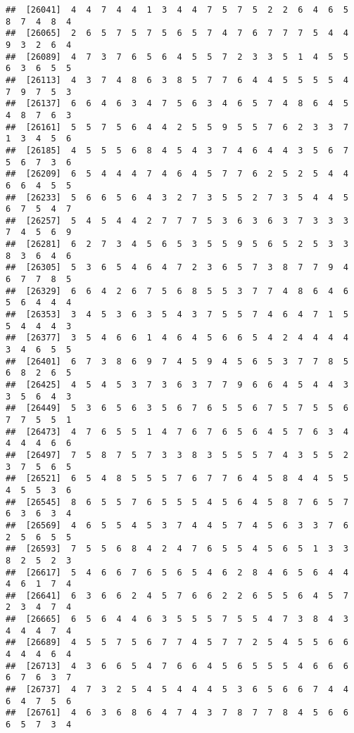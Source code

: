 \documentclass[
]{book}
\begin{document}
\begin{verbatim}
##  [26041]  4  4  7  4  4  1  3  4  4  7  5  7  5  2  2  6  4  6  5  8  7  4  8  4
##  [26065]  2  6  5  7  5  7  5  6  5  7  4  7  6  7  7  7  5  4  4  9  3  2  6  4
##  [26089]  4  7  3  7  6  5  6  4  5  5  7  2  3  3  5  1  4  5  5  6  3  6  5  5
##  [26113]  4  3  7  4  8  6  3  8  5  7  7  6  4  4  5  5  5  5  4  7  9  7  5  3
##  [26137]  6  6  4  6  3  4  7  5  6  3  4  6  5  7  4  8  6  4  5  4  8  7  6  3
##  [26161]  5  5  7  5  6  4  4  2  5  5  9  5  5  7  6  2  3  3  7  1  3  4  5  6
##  [26185]  4  5  5  5  6  8  4  5  4  3  7  4  6  4  4  3  5  6  7  5  6  7  3  6
##  [26209]  6  5  4  4  4  7  4  6  4  5  7  7  6  2  5  2  5  4  4  6  6  4  5  5
##  [26233]  5  6  6  5  6  4  3  2  7  3  5  5  2  7  3  5  4  4  5  6  7  5  4  7
##  [26257]  5  4  5  4  4  2  7  7  7  5  3  6  3  6  3  7  3  3  3  7  4  5  6  9
##  [26281]  6  2  7  3  4  5  6  5  3  5  5  9  5  6  5  2  5  3  3  8  3  6  4  6
##  [26305]  5  3  6  5  4  6  4  7  2  3  6  5  7  3  8  7  7  9  4  6  7  7  8  5
##  [26329]  6  6  4  2  6  7  5  6  8  5  5  3  7  7  4  8  6  4  6  5  6  4  4  4
##  [26353]  3  4  5  3  6  3  5  4  3  7  5  5  7  4  6  4  7  1  5  5  4  4  4  3
##  [26377]  3  5  4  6  6  1  4  6  4  5  6  6  5  4  2  4  4  4  4  3  4  6  5  5
##  [26401]  6  7  3  8  6  9  7  4  5  9  4  5  6  5  3  7  7  8  5  6  8  2  6  5
##  [26425]  4  5  4  5  3  7  3  6  3  7  7  9  6  6  4  5  4  4  3  3  5  6  4  3
##  [26449]  5  3  6  5  6  3  5  6  7  6  5  5  6  7  5  7  5  5  6  7  7  5  5  1
##  [26473]  4  7  6  5  5  1  4  7  6  7  6  5  6  4  5  7  6  3  4  4  4  4  6  6
##  [26497]  7  5  8  7  5  7  3  3  8  3  5  5  5  7  4  3  5  5  2  3  7  5  6  5
##  [26521]  6  5  4  8  5  5  5  7  6  7  7  6  4  5  8  4  4  5  5  4  5  5  3  6
##  [26545]  8  6  5  5  7  6  5  5  5  4  5  6  4  5  8  7  6  5  7  6  3  6  3  4
##  [26569]  4  6  5  5  4  5  3  7  4  4  5  7  4  5  6  3  3  7  6  2  5  6  5  5
##  [26593]  7  5  5  6  8  4  2  4  7  6  5  5  4  5  6  5  1  3  3  8  2  5  2  3
##  [26617]  5  4  6  6  7  6  5  6  5  4  6  2  8  4  6  5  6  4  4  4  6  1  7  4
##  [26641]  6  3  6  6  2  4  5  7  6  6  2  2  6  5  5  6  4  5  7  2  3  4  7  4
##  [26665]  6  5  6  4  4  6  3  5  5  5  7  5  5  4  7  3  8  4  3  4  4  4  7  4
##  [26689]  4  5  5  7  5  6  7  7  4  5  7  7  2  5  4  5  5  6  6  4  4  4  6  4
##  [26713]  4  3  6  6  5  4  7  6  6  4  5  6  5  5  5  4  6  6  6  6  7  6  3  7
##  [26737]  4  7  3  2  5  4  5  4  4  4  5  3  6  5  6  6  7  4  4  6  4  7  5  6
##  [26761]  4  6  3  6  8  6  4  7  4  3  7  8  7  7  8  4  5  6  6  6  5  7  3  4

\end{verbatim}
\end{document}
